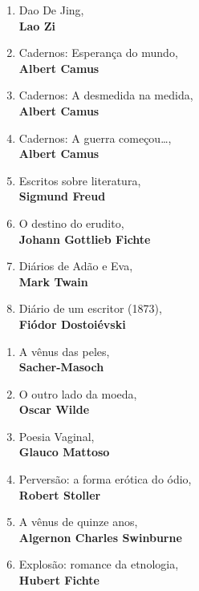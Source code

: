 \medskip

{}

\begin{enumerate} [font=\Formular\scriptsize]
\setlength\parskip{8pt}
\setlength\itemsep{-1.4mm}
\item Dao De Jing,\\ \textbf{Lao Zi}
\item Cadernos: Esperança do mundo,\\ \textbf{Albert Camus}
\item Cadernos: A desmedida na medida,\\ \textbf{Albert Camus}
\item Cadernos: A guerra começou\ldots,\\ \textbf{Albert Camus}
\item Escritos sobre literatura,\\ \textbf{Sigmund Freud}
\item O destino do erudito,\\ \textbf{Johann Gottlieb Fichte}
\item Diários de Adão e Eva,\\ \textbf{Mark Twain}
\item Diário de um escritor (1873),\\ \textbf{Fiódor Dostoiévski}
\end{enumerate}


\medskip
{}

\begin{enumerate} [font=\Formular\scriptsize]
\setlength\parskip{8pt}
\setlength\itemsep{-1.4mm}

\item A vênus das peles,\\ \textbf{Sacher{}-Masoch}
\item O outro lado da moeda,\\ \textbf{Oscar Wilde}
\item Poesia Vaginal,\\ \textbf{Glauco Mattoso }
\item Perversão: a forma erótica do ódio,\\ \textbf{Robert Stoller}
\item A vênus de quinze anos,\\ \textbf{Algernon Charles Swinburne}
\item Explosão: romance da etnologia,\\ \textbf{Hubert Fichte}
\end{enumerate}

